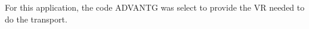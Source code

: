 For this application, the code ADVANTG was select to provide the VR needed to do the transport.








